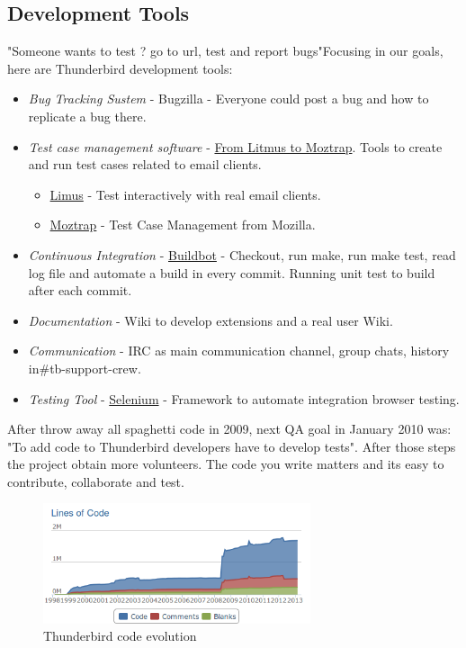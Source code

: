 \documentclass[11pt]{scrartcl}
\begin{document}
\subsection{Development Tools} "Someone wants to test ? go to url, test and report bugs"Focusing in our goals, here are Thunderbird development tools:
\begin{itemize}
	\item \textit{Bug Tracking Sustem} - Bugzilla - Everyone could post a bug and how to replicate a bug there.
	\item \textit{Test case management software} - \href{https://mail.mozilla.org/pipermail/thunderbird-testers/2012-October/000111.html}{From Litmus to Moztrap}. Tools to create and run test cases related to email clients.
\begin{itemize}
	\item \href{http://litmus.com/}{Limus} - Test interactively with real email clients.
	\item \href{http://moztrap.wordpress.com/}{Moztrap} - Test Case Management from Mozilla.
\end{itemize}
	\item \textit{Continuous Integration} - \href{http://trac.buildbot.net/}{Buildbot} - Checkout, run make, run make test, read log file and automate a build in every commit. Running unit test to build after each commit.
	\item \textit{Documentation} - Wiki to develop extensions and a real user Wiki.
	\item \textit{Communication} - IRC as main communication channel, group chats, history in\#tb-support-crew.
	\item \textit{Testing Tool} - \href{http://docs.seleniumhq.org/}{Selenium} - Framework to automate integration browser testing.
\end{itemize} After throw away all spaghetti code in 2009, next QA goal in January 2010 was: "To add code to Thunderbird developers have to develop tests". After those steps the project obtain more volunteers. The code you write matters and its easy to contribute, collaborate and test.

\begin{figure}[H]
\centering
\includegraphics[width=0.7\textwidth]{thunderbird-code-evolution.png}
\caption{Thunderbird code evolution}
\label{}
\end{figure}
\end{document}
